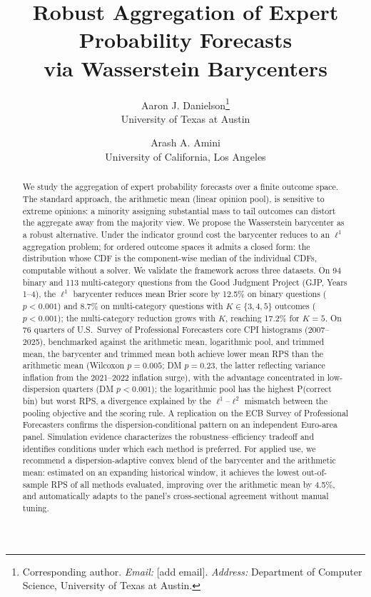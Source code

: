 \documentclass[12pt]{article}
\numberwithin{equation}{section}
\begin{document}
\title{Robust Aggregation of Expert Probability Forecasts\\
       via Wasserstein Barycenters}

\author{Aaron J. Danielson\thanks{Corresponding author.
        \textit{Email:} [add email].
        \textit{Address:} Department of Computer Science, University of Texas at Austin.}\\[0.5ex]
        University of Texas at Austin
        \and
        Arash A. Amini\\[0.5ex]
        University of California, Los Angeles}

\date{}
\maketitle

\begin{abstract}
We study the aggregation of expert probability forecasts over a finite outcome space.
The standard approach, the arithmetic mean (linear opinion pool), is sensitive to extreme opinions: a minority assigning substantial mass to tail outcomes can distort the aggregate away from the majority view.
We propose the Wasserstein barycenter as a robust alternative.
Under the indicator ground cost the barycenter reduces to an $\ell^1$ aggregation problem; for ordered outcome spaces it admits a closed form: the distribution whose CDF is the component-wise median of the individual CDFs, computable without a solver.
We validate the framework across three datasets.
On 94 binary and 113 multi-category questions from the Good Judgment Project (GJP, Years 1--4), the $\ell^1$ barycenter reduces mean Brier score by 12.5\% on binary questions ($p < 0.001$) and 8.7\% on multi-category questions with $K\in\{3,4,5\}$ outcomes ($p < 0.001$); the multi-category reduction grows with $K$, reaching 17.2\% for $K=5$.
On 76 quarters of U.S.\ Survey of Professional Forecasters core CPI histograms (2007--2025), benchmarked against the arithmetic mean, logarithmic pool, and trimmed mean, the barycenter and trimmed mean both achieve lower mean RPS than the arithmetic mean (Wilcoxon $p = 0.005$; DM $p = 0.23$, the latter reflecting variance inflation from the 2021--2022 inflation surge), with the advantage concentrated in low-dispersion quarters (DM $p < 0.001$); the logarithmic pool has the highest P(correct bin) but worst RPS, a divergence explained by the $\ell^1$--$\ell^2$ mismatch between the pooling objective and the scoring rule.
A replication on the ECB Survey of Professional Forecasters confirms the dispersion-conditional pattern on an independent Euro-area panel.
Simulation evidence characterizes the robustness--efficiency tradeoff and identifies conditions under which each method is preferred.
For applied use, we recommend a dispersion-adaptive convex blend of the barycenter and the arithmetic mean: estimated on an expanding historical window, it achieves the lowest out-of-sample RPS of all methods evaluated, improving over the arithmetic mean by 4.5\%, and automatically adapts to the panel's cross-sectional agreement without manual tuning.
\end{abstract}
\end{document}
